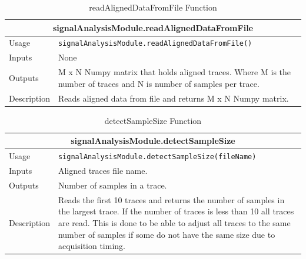\documentclass{llncs}
\numberwithin{algorithm}{chapter}
\begin{document}
\begin{table}[H]
\caption{readAlignedDataFromFile Function}
\begin{tabular}{ |p{2cm}||p{11cm}|  }
 \hline
 \multicolumn{2}{|c|}{\cellcolor{teal}\textbf{signalAnalysisModule.readAlignedDataFromFile}} \\
 \hline
 Usage & \texttt{signalAnalysisModule.readAlignedDataFromFile()}\\ \hline
 Inputs & None \\ \hline
 Outputs & M x N Numpy matrix that holds aligned traces. Where M is the number of traces and N is number of samples per trace.\\ \hline
 Description & Reads aligned data from file and returns M x N Numpy matrix. \\ \hline
\end{tabular}
\end{table}

\begin{table}[H]
\caption{detectSampleSize Function}
\begin{tabular}{ |p{2cm}||p{11cm}|  }
 \hline
 \multicolumn{2}{|c|}{\cellcolor{teal}\textbf{signalAnalysisModule.detectSampleSize}} \\
 \hline
 Usage & \texttt{signalAnalysisModule.detectSampleSize(fileName)}\\ \hline
 Inputs & Aligned traces file name. \\ \hline
 Outputs & Number of samples in a trace. \\ \hline
 Description & Reads the first 10 traces and returns the number of samples in the largest trace.
If the number of traces is less than 10 all traces are read.
This is done to be able to adjust all traces to the same number of samples if some do not have the same size due to acquisition timing. \\ \hline
\end{tabular}
\end{table}
\end{document}
